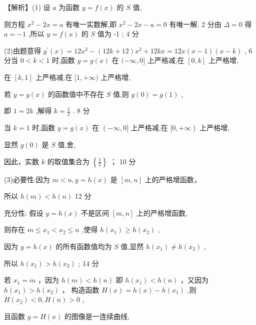 \documentclass[10pt]{article}
\newcommand*\circled[1]{\tikz[baseline=(char.base)]{\node[shape=circle,draw,inner sep=1.5pt] (char) {\small #1};}}
\begin{document}
【解析】(1) 设 \(a\) 为函数 \(y = f\left( x\right)\) 的 \(S\) 值,

则方程 \({x}^{2} - {2x} = a\) 有唯一实数解,即 \({x}^{2} - {2x} - a = 0\) 有唯一解, 2 分由 \(\Delta  = 0\) 得 \(a =  - 1\) ,所以 \(y = f\left( x\right)\) 的 \(S\) 值为 -1 ; 4 分

(2)由题意得 \({g}^{\prime }\left( x\right)  = {12}{x}^{3} - \left( {{12k} + {12}}\right) {x}^{2} + {12kx} = {12x}\left( {x - 1}\right) \left( {x - k}\right)\) , 6 分当 \(0 < k < 1\) 时,函数 \(y = g\left( x\right)\) 在 \(( - \infty ,0\rbrack\) 上严格减,在 \(\left\lbrack  {0,k}\right\rbrack\) 上严格增,

在 \(\left\lbrack  {k,1}\right\rbrack\) 上严格减,在 \(\lbrack 1, + \infty )\) 上严格增,

若 \(y = g\left( x\right)\) 的函数值中不存在 \(S\) 值,则 \(g\left( 0\right)  = g\left( 1\right)\) ,

即 \(1 = {2k}\) ,解得 \(k = \frac{1}{2}\) . 8 分

当 \(k = 1\) 时,函数 \(y = g\left( x\right)\) 在 \(\left( {-\infty ,0\rbrack \text{ 上严格减,在 }\lbrack 0, + \infty }\right)\) 上严格增,

显然 \(g\left( 0\right)\) 是 \(S\) 值,舍,

因此，实数 \(k\) 的取值集合为 \(\left\{  \frac{1}{2}\right\}\) ； 10 分

(3)必要性:因为 \(m < n,y = h\left( x\right)\) 是 \(\left\lbrack  {m,n}\right\rbrack\) 上的严格增函数，

所以 \(h\left( m\right)  < h\left( n\right)\) 12 分

充分性: 假设 \(y = h\left( x\right)\) 不是区间 \(\left\lbrack  {m,n}\right\rbrack\) 上的严格增函数,

则存在 \(m \leq  {x}_{1} < {x}_{2} \leq  n\) ,使得 \(h\left( {x}_{1}\right)  \geq  h\left( {x}_{2}\right)\) ,

因为 \(y = h\left( x\right)\) 的所有函数值均为 \(S\) 值,显然 \(h\left( {x}_{1}\right)  \neq  h\left( {x}_{2}\right)\) ,

所以 \(h\left( {x}_{1}\right)  > h\left( {x}_{2}\right)\) ; 14 分

 \circled{1}  若 \({x}_{1} = m\) ，因为 \(h\left( m\right)  < h\left( n\right)\) 即 \(h\left( {x}_{1}\right)  < h\left( n\right)\) ，又因为 \(h\left( {x}_{1}\right)  > h\left( {x}_{2}\right)\) ， 构造函数 \(H\left( x\right)  = h\left( x\right)  - h\left( {x}_{1}\right)\) ,则 \(H\left( {x}_{2}\right)  < 0,H\left( n\right)  > 0\) ,

且函数 \(y = H\left( x\right)\) 的图像是一连续曲线,
\end{document}

